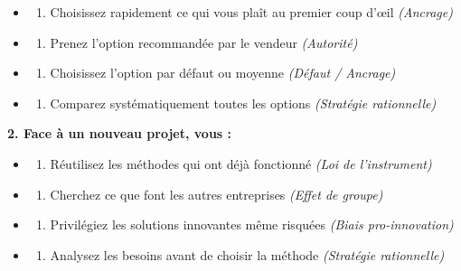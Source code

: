 \documentclass[
]{article}
\providecommand{\tightlist}{%
  \setlength{\itemsep}{0pt}\setlength{\parskip}{0pt}}
\begin{document}
\begin{itemize}
\tightlist
\item
  \begin{enumerate}
  \def\labelenumi{\alph{enumi})}
  \tightlist
  \item
    Choisissez rapidement ce qui vous plaît au premier coup d'œil
    \emph{(Ancrage)}
  \end{enumerate}
\item
  \begin{enumerate}
  \def\labelenumi{\alph{enumi})}
  \setcounter{enumi}{1}
  \tightlist
  \item
    Prenez l'option recommandée par le vendeur \emph{(Autorité)}
  \end{enumerate}
\item
  \begin{enumerate}
  \def\labelenumi{\alph{enumi})}
  \setcounter{enumi}{2}
  \tightlist
  \item
    Choisissez l'option par défaut ou moyenne \emph{(Défaut / Ancrage)}
  \end{enumerate}
\item
  \begin{enumerate}
  \def\labelenumi{\alph{enumi})}
  \setcounter{enumi}{3}
  \tightlist
  \item
    Comparez systématiquement toutes les options \emph{(Stratégie
    rationnelle)}
  \end{enumerate}
\end{itemize}

\textbf{2. Face à un nouveau projet, vous :}

\begin{itemize}
\tightlist
\item
  \begin{enumerate}
  \def\labelenumi{\alph{enumi})}
  \tightlist
  \item
    Réutilisez les méthodes qui ont déjà fonctionné \emph{(Loi de
    l'instrument)}
  \end{enumerate}
\item
  \begin{enumerate}
  \def\labelenumi{\alph{enumi})}
  \setcounter{enumi}{1}
  \tightlist
  \item
    Cherchez ce que font les autres entreprises \emph{(Effet de groupe)}
  \end{enumerate}
\item
  \begin{enumerate}
  \def\labelenumi{\alph{enumi})}
  \setcounter{enumi}{2}
  \tightlist
  \item
    Privilégiez les solutions innovantes même risquées \emph{(Biais
    pro-innovation)}
  \end{enumerate}
\item
  \begin{enumerate}
  \def\labelenumi{\alph{enumi})}
  \setcounter{enumi}{3}
  \tightlist
  \item
    Analysez les besoins avant de choisir la méthode \emph{(Stratégie
    rationnelle)}
  \end{enumerate}
\end{itemize}
\end{document}
